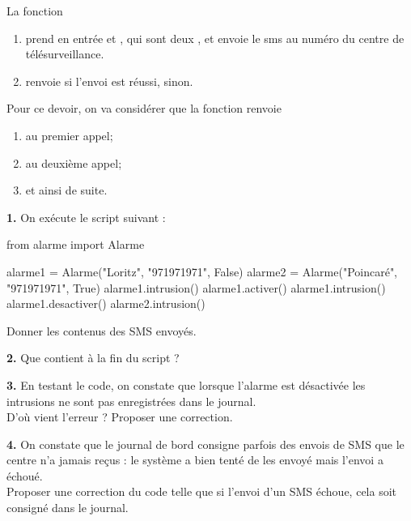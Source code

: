 \documentclass[a4paper,10pt,french]{book}
\begin{document}
La fonction 
\begin{enumerate}[\textbullet]
	\item 	prend en entrée  et , qui sont deux , et envoie le sms au numéro du centre de télésurveillance.
	\item 	renvoie  si l'envoi est réussi,  sinon.\\
\end{enumerate}
\medskip
Pour ce devoir, on va considérer que la fonction  renvoie
\begin{enumerate}[\textbullet]
	\item 	{} au premier appel;
	\item 	{} au deuxième appel;
    \item   et ainsi de suite.\\
\end{enumerate}
\medskip

\textbf{1.} On exécute le script suivant :

\begin{pythoncode}
from alarme import Alarme

alarme1 = Alarme("Loritz", "971971971", False)
alarme2 = Alarme("Poincaré", "971971971", True)
alarme1.intrusion()
alarme1.activer()
alarme1.intrusion()
alarme1.desactiver()
alarme2.intrusion()
\end{pythoncode}

Donner les contenus des SMS envoyés.\\

\medskip

\textbf{2.} Que contient  à la fin du script ?\\

\medskip

\textbf{3.} En testant le code, on constate que lorsque l'alarme est désactivée les intrusions ne sont pas enregistrées dans le journal.\\
D'où vient l'erreur ? Proposer une correction.\\

\medskip

\textbf{4.} On constate que le journal de bord consigne parfois des envois de SMS que le centre n'a jamais reçus : le système a bien tenté de les envoyé mais l'envoi a échoué.\\
Proposer une correction du code telle que si l'envoi d'un SMS échoue, cela soit consigné dans le journal.\\
\end{document}
